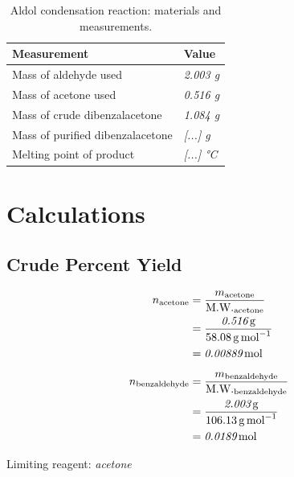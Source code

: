 \documentclass[
  10pt,
  twocolumn,
  letterpaper,
]{article}
\begin{document}
\begin{table}[H]
  \centering
  \caption{Aldol condensation reaction: materials and measurements.}
  \label{tab:data}
  \begin{tabular}{@{}p{}p{}@{}}
    \toprule
    \textbf{Measurement} & \textbf{Value} \\
    \midrule
    Mass of aldehyde used             & \textit{2.003 g} \\
    Mass of acetone used                  & \textit{0.516 g} \\
    Mass of crude dibenzalacetone         & \textit{1.084 g} \\
    Mass of purified dibenzalacetone      & \textit{[...] g} \\
    Melting point of product              & \textit{[...] \si{\celsius}} \\
    \bottomrule
  \end{tabular}
\end{table}


\section{Calculations}

\subsection{Crude Percent Yield}

\begin{align*}
  n_{\text{acetone}}  &= \frac{m_{\text{acetone}}}{\text{M.W.}_{\text{acetone}}} \\
                      &= \frac{\textit{0.516\,\si{\gram}}}{\SI{58.08}{\gram\per\mol}} \\
                      &= \textit{0.00889\,\si{\mol}} \\[6pt]
  n_{\text{benzaldehyde}} &= \frac{m_{\text{benzaldehyde}}}{\text{M.W.}_{\text{benzaldehyde}}} \\
                          &= \frac{\textit{2.003\,\si{\gram}}}{\SI{106.13}{\gram\per\mol}} \\
                          &= \textit{0.0189\,\si{\mol}}
\end{align*}

\noindent Limiting reagent: \textit{acetone}
\end{document}
